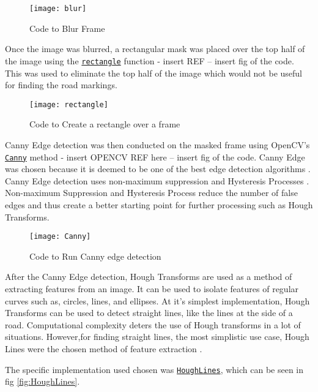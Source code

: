 \documentclass[conference]{IEEEtran}
\begin{document}
\begin{figure}[H]
\centerline{\texttt{[image: blur]}}
\caption{Code to Blur Frame}
\label{fig:blur}
\end{figure} 

Once the  image was blurred, a rectangular mask was placed over the top half of the image using the \href{https://docs.opencv.org/4.x/d6/d6e/group__imgproc__draw.html#ga07d2f74cadcf8e305e810ce8eed13bc9}{\texttt{rectangle}} function - insert REF -- insert fig of the code. This was used to eliminate the top half of the image which would not be useful for finding the road markings. 

\begin{figure}[H]
\centerline{\texttt{[image: rectangle]}}
\caption{Code to Create a rectangle over a frame}
\label{fig:rectangle}
\end{figure}
 
Canny Edge detection was then conducted on the masked frame using OpenCV's \href{https://docs.opencv.org/4.x/dd/d1a/group__imgproc__feature.html#ga04723e007ed888ddf11d9ba04e2232de}{\texttt{Canny}} method - insert OPENCV REF here -- insert fig of the code. Canny Edge was chosen because it is deemed to be one of the best edge detection algorithms \cite{Canny2009CannyED}. Canny Edge detection uses non-maximum suppression \cite{non-maximum_supression} and Hysteresis Processes \cite{Hysteresis_Thresholding}. Non-maximum Suppression and Hysteresis Process reduce the number of false edges and thus create a better starting point for further processing such as Hough Transforms. 

\begin{figure}[H]
\centerline{\texttt{[image: Canny]}}
\caption{Code to Run Canny edge detection}
\label{fig:Canny}
\end{figure}

After the Canny Edge detection, Hough Transforms are used as a method of extracting features from an image. It can be used to isolate features of regular curves such as, circles, lines, and ellipses. At it's simplest implementation, Hough Transforms can be used to detect straight lines, like the lines at the side of a road. Computational complexity deters the use of Hough transforms in a lot of situations. However,for finding straight lines, the most simplistic use case, Hough Lines were the chosen method of feature extraction \cite{Hough_Transform}.

The specific implementation used chosen was \href{https://docs.opencv.org/3.4/d9/db0/tutorial_hough_lines.html}{\texttt{HoughLines}}, which can be seen in fig \ref{fig:HoughLines}.
\end{document}
